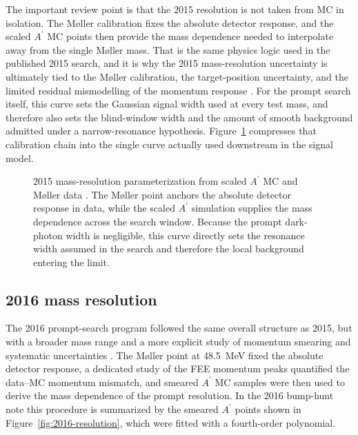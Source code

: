 The important review point is that the 2015 resolution is not taken from MC in
isolation. The M{\o}ller calibration fixes the absolute detector response, and the
scaled $A^\prime$ MC points then provide the mass dependence needed to interpolate away
from the single M{\o}ller mass. That is the same physics logic used in the published
2015 search, and it is why the 2015 mass-resolution uncertainty is ultimately tied to
the M{\o}ller calibration, the target-position uncertainty, and the limited residual
mismodelling of the momentum response \cite{HPS2015DarkPhoton,HPS2015InternalNote}.
For the prompt search itself, this curve sets the Gaussian signal width used at every
test mass, and therefore also sets the blind-window width and the amount of smooth
background admitted under a narrow-resonance hypothesis. Figure~\ref{fig:2015-resolution}
compresses that calibration chain into the single curve actually used downstream in the
signal model.

\begin{figure}[H]
\centering
{}
\caption{2015 mass-resolution parameterization from scaled $A^\prime$ MC and M{\o}ller
data \cite{HPS2015InternalNote}. The M{\o}ller point anchors the absolute detector
response in data, while the scaled $A^\prime$ simulation supplies the mass dependence
across the search window. Because the prompt dark-photon width is negligible, this
curve directly sets the resonance width assumed in the search and therefore the local
background entering the limit.}
\label{fig:2015-resolution}
\end{figure}

\subsection{2016 mass resolution}
\label{sec:massres-2016}

The 2016 prompt-search program followed the same overall structure as 2015, but with a
broader mass range and a more explicit study of momentum smearing and systematic
uncertainties \cite{HPS2016BumpInternal,HPS2016PromptLong}. The M{\o}ller point at
\SI{48.5}{MeV} fixed the absolute detector response, a dedicated study of the FEE
momentum peaks quantified the data--MC momentum mismatch, and smeared $A^\prime$ MC
samples were then used to derive the mass dependence of the prompt resolution. In the
2016 bump-hunt note this procedure is summarized by the smeared $A^\prime$ points shown
in Figure~\ref{fig:2016-resolution}, which were fitted with a fourth-order polynomial.

